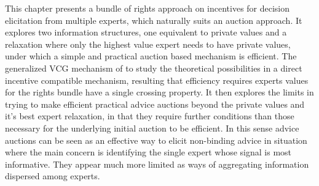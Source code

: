 This chapter presents a bundle of rights approach on  incentives for decision elicitation from multiple experts, which naturally suits an auction approach.
It explores two information structures, one equivalent to private values and a relaxation where only the highest value expert needs to have private values, under which a simple and practical auction based mechanism is efficient. 
The generalized VCG mechanism of \citep{maskin1992auctions} to study the theoretical possibilities in a direct incentive compatible mechanism, resulting that efficiency requires experts values for the rights bundle have a single crossing property.
It then explores  the limits in trying to make efficient practical advice auctions beyond the private values and it's best expert relaxation, in that they require further conditions than those necessary for the underlying initial auction to be efficient.
In this sense advice auctions can be seen as an effective way to elicit non-binding advice in situation where the main concern is identifying the single expert whose signal is most informative.  They appear much more limited as ways of aggregating information dispersed among experts. 


